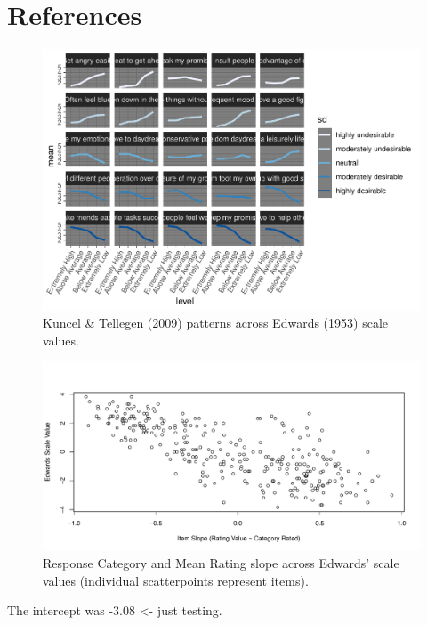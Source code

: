 \documentclass[
  english,
  ,jou]{apa6}
\begin{document}
\hypertarget{references}{%
\section{References}\label{references}}

\begin{figure}
\centering
\includegraphics{KuncelTellegen2_files/figure-latex/Figure2-1.pdf}
\caption{\label{fig:Figure2}Kuncel \& Tellegen (2009) patterns across Edwards (1953) scale values.}
\end{figure}

\begin{figure}
\centering
\includegraphics{KuncelTellegen2_files/figure-latex/Figure3-1.pdf}
\caption{\label{fig:Figure3}Response Category and Mean Rating slope across Edwards' scale values (individual scatterpoints represent items).}
\end{figure}

The intercept was -3.08 \textless- just testing.

\begingroup
\setlength{\parindent}{-0.5in}
\setlength{\leftskip}{0.5in}
\end{document}
